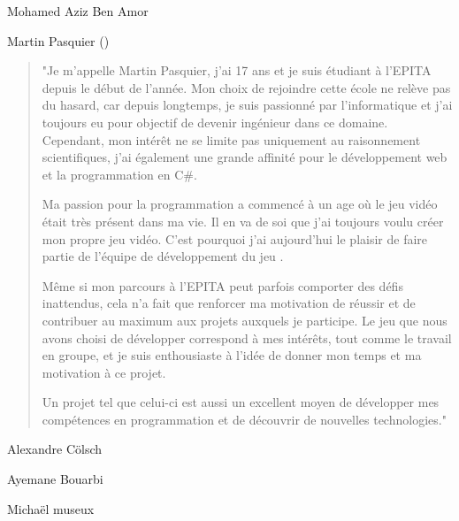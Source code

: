 Mohamed Aziz Ben Amor




Martin Pasquier
()
\begin{quote}
    
    "Je m'appelle Martin Pasquier, j'ai 17 ans et je suis étudiant à l'EPITA depuis le début de l'année. 
    Mon choix de rejoindre cette école ne relève pas du hasard, car depuis longtemps, je suis passionné par l'informatique et j'ai toujours eu pour objectif de devenir ingénieur dans ce domaine. 
    Cependant, mon intérêt ne se limite pas uniquement au raisonnement scientifiques, j'ai également une grande affinité pour le développement web et la programmation en C\#. 
    
    Ma passion pour la programmation a commencé à un age où le jeu vidéo était très présent dans ma vie. Il en va de soi que j'ai toujours voulu créer mon propre jeu vidéo.
    C'est pourquoi j'ai aujourd'hui le plaisir de faire partie de l'équipe de développement du jeu \gameName.
    
    Même si mon parcours à l'EPITA peut parfois comporter des défis inattendus, cela n'a fait que renforcer ma motivation de réussir et de contribuer au maximum aux projets auxquels je participe.
    Le jeu que nous avons choisi de développer correspond à mes intérêts, tout comme le travail en groupe, et je suis enthousiaste à l'idée de donner mon temps et ma motivation à ce projet.
    
    Un projet tel que celui-ci est aussi un excellent moyen de développer mes compétences en programmation et de découvrir de nouvelles technologies."
    
\end{quote}




Alexandre Cölsch




Ayemane Bouarbi




Michaël museux




